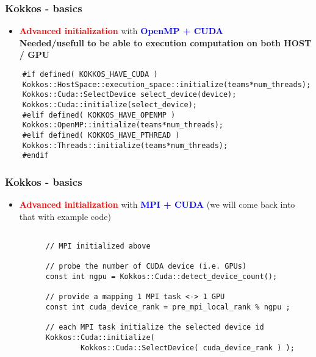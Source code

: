 \begin{frame}[fragile=singleslide]
  \frametitle{Kokkos - basics}

  \begin{itemize}
  \item \textcolor{red}{\textbf{Advanced initialization}} with \textcolor{blue}{\textbf{OpenMP + CUDA}}\\
    \textbf{Needed/usefull to be able to execution computation on both HOST / GPU}
  \end{itemize}
  \begin{verbatim}
    #if defined( KOKKOS_HAVE_CUDA )
    Kokkos::HostSpace::execution_space::initialize(teams*num_threads);
    Kokkos::Cuda::SelectDevice select_device(device);
    Kokkos::Cuda::initialize(select_device);
    #elif defined( KOKKOS_HAVE_OPENMP )
    Kokkos::OpenMP::initialize(teams*num_threads);
    #elif defined( KOKKOS_HAVE_PTHREAD )
    Kokkos::Threads::initialize(teams*num_threads);
    #endif
  \end{verbatim}
\end{frame}


\begin{frame}[fragile=singleslide]
  \frametitle{Kokkos - basics}

  \begin{itemize}
  \item \textcolor{red}{\textbf{Advanced initialization}} with \textcolor{blue}{\textbf{MPI + CUDA}}
    (we will come back into that with example code)
    \begin{verbatim}

      // MPI initialized above

      // probe the number of CUDA device (i.e. GPUs)
      const int ngpu = Kokkos::Cuda::detect_device_count();

      // provide a mapping 1 MPI task <-> 1 GPU
      const int cuda_device_rank = pre_mpi_local_rank % ngpu ;

      // each MPI task initialize the selected device id
      Kokkos::Cuda::initialize(
              Kokkos::Cuda::SelectDevice( cuda_device_rank ) );
    \end{verbatim}
  \end{itemize}
\end{frame}
